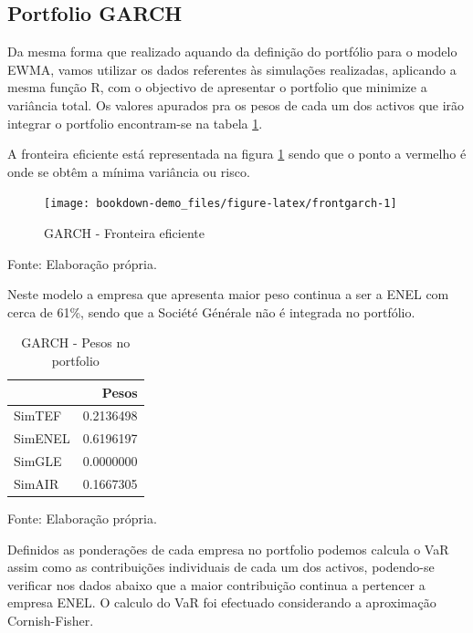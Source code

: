\documentclass[
  12pt,
  a4paper,
  openany]{book}
\begin{document}
\hypertarget{portfolio-garch}{%
\subsection{Portfolio GARCH}\label{portfolio-garch}}

Da mesma forma que realizado aquando da definição do portfólio para o modelo EWMA, vamos utilizar os dados referentes às simulações realizadas, aplicando a mesma função R, com o objectivo de apresentar o portfolio que minimize a variância total. Os valores apurados pra os pesos de cada um dos activos que irão integrar o portfolio encontram-se na tabela \ref{tab:pgarchw}.

A fronteira eficiente está representada na figura \ref{fig:frontgarch} sendo que o ponto a vermelho é onde se obtêm a mínima variância ou risco.

\begin{figure}

{\centering \texttt{[image: bookdown-demo\_files/figure-latex/frontgarch-1]} 

}

\caption{GARCH - Fronteira eficiente}\label{fig:frontgarch}
\end{figure}
\FloatBarrier
\centering

Fonte: Elaboração própria.

\justifying
\bigskip

Neste modelo a empresa que apresenta maior peso continua a ser a ENEL com cerca de 61\%, sendo que a Société Générale não é integrada no portfólio.

\begin{table}[!h]

\caption{\label{tab:pgarchw}GARCH - Pesos no portfolio}
\centering
\begin{tabular}[t]{lr}
\toprule
  & Pesos\\
\midrule
SimTEF & 0.2136498\\
SimENEL & 0.6196197\\
SimGLE & 0.0000000\\
SimAIR & 0.1667305\\
\bottomrule
\end{tabular}
\end{table}
\FloatBarrier
\centering

Fonte: Elaboração própria.

\justifying
\bigskip

Definidos as ponderações de cada empresa no portfolio podemos calcula o VaR assim como as contribuições individuais de cada um dos activos, podendo-se verificar nos dados abaixo que a maior contribuição continua a pertencer a empresa ENEL. O calculo do VaR foi efectuado considerando a aproximação Cornish-Fisher.
\end{document}
